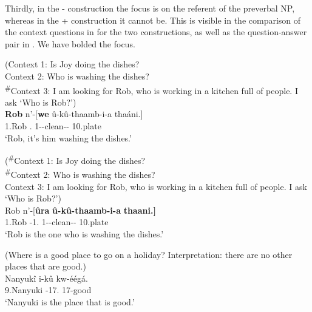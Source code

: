 \documentclass[output=paper]{langscibook}
\begin{document}
Thirdly, in the \NI-\PRO{} construction the focus is on the referent of the preverbal NP, whereas in the \NI+\RM{} construction it cannot be. This is visible in the comparison of the context questions in  for the two constructions, as well as the question-answer pair in . We have bolded the focus.\largerpage[2.25]

\ea
\label{bkm:Ref111719190}
\ea
(Context 1: Is Joy doing the dishes?\\
Context 2: Who is washing the dishes?\\
\textsuperscript{\#}Context 3: I am looking for Rob, who is working in a kitchen full of people. I ask ‘Who is Rob?’)\\
\gll
\textbf{Rob}  n’-[\textbf{we}  û-kû-thaamb-i-a  thaáni.]\\
1.Rob .\PRO{} 1\RM-\PRS{}-clean-\IC{}-\FV{} 10.plate\\ \jambox*{}
\glt
‘Rob, it’s him washing the dishes.’

\ex
(\textsuperscript{\#}Context 1: Is Joy doing the dishes?\\
\textsuperscript{\#}Context 2: Who is washing the dishes?\\
Context 3: I am looking for Rob, who is working in a kitchen full of people. I ask ‘Who is Rob?’)\\
\gll
Rob  n’-[\textbf{ûra}  \textbf{û-kû-thaamb-i-a}  \textbf{thaani.]} \\
1.Rob \COP{}-1.\RM{} 1\RM-\PRS{}-clean-\IC{}-\FV{}  10.plate\\
\glt
‘Rob is the one who is washing the dishes.’

\z

\ex
\label{bkm:Ref111722601}
(Where is a good place to go on a holiday? Interpretation: there are no other places that are good.)\\
\gll
Nanyukî  i-kû  kw-éégá.\\
9.Nanyuki \COP{}-17.\PRO{} 17-good\\
\glt
‘Nanyuki is the place that is good.’

\z
\end{document}

